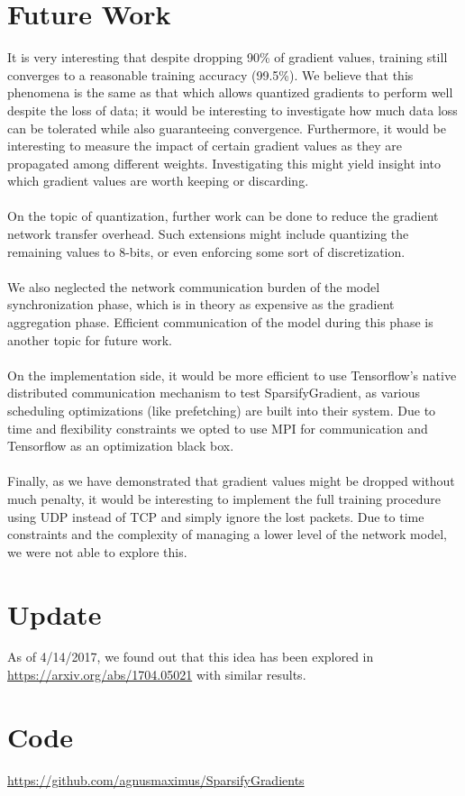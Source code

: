 \documentclass[10pt]{article}
\begin{document}
\section{Future Work}
\label{sec-7}

It is very interesting that despite dropping 90\% of gradient values,
training still converges to a reasonable training accuracy (99.5\%). We
believe that this phenomena is the same as that which allows quantized
gradients to perform well despite the loss of data; it would be
interesting to investigate how much data loss can be tolerated while
also guaranteeing convergence. Furthermore, it would be interesting to
measure the impact of certain gradient values as they are propagated
among different weights. Investigating this might yield insight into which gradient values are worth keeping or discarding.
\\
\\
On the topic of quantization, further work can be done to reduce the
gradient network transfer overhead. Such extensions might include
quantizing the remaining values to 8-bits, or even enforcing some sort
of discretization.
\\
\\
We also neglected the network communication burden of the model
synchronization phase, which is in theory as expensive as the gradient
aggregation phase. Efficient communication of the model during this
phase is another topic for future work.
\\
\\
On the implementation side, it would be more efficient to use Tensorflow's native
distributed communication mechanism to test SparsifyGradient, as various scheduling optimizations (like prefetching)
are built into their system. Due to time and flexibility constraints we
opted to use MPI for communication and Tensorflow as an optimization black box.
\\
\\
Finally, as we have demonstrated that gradient values might be dropped
without much penalty, it would be interesting to implement the full
training procedure using UDP instead of TCP and simply ignore the
lost packets. Due to time constraints and the complexity of managing a
lower level of the network model, we were not able to explore this.

\section{Update}
\label{sec-8}
As of 4/14/2017, we found out that this idea has been explored in \url{https://arxiv.org/abs/1704.05021} with similar results.

\section{Code}
\label{sec-9}
\url{https://github.com/agnusmaximus/SparsifyGradients}
\end{document}
